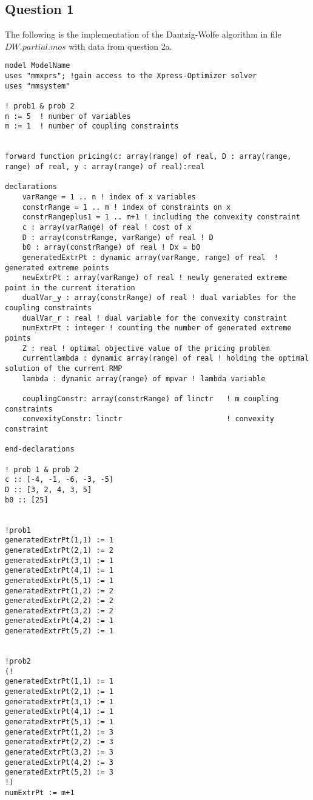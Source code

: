 \documentclass[twoside,12pt]{article}
\begin{document}
\subsection{Question 1}
\label{p3_q1}
The following is the implementation of the Dantzig-Wolfe algorithm in file $DW.partial.mos$ with data  from question 2a.
\\
\begin{verbatim}
model ModelName
uses "mmxprs"; !gain access to the Xpress-Optimizer solver
uses "mmsystem"

! prob1 & prob 2
n := 5  ! number of variables
m := 1  ! number of coupling constraints


forward function pricing(c: array(range) of real, D : array(range, range) of real, y : array(range) of real):real

declarations
	varRange = 1 .. n ! index of x variables
	constrRange = 1 .. m ! index of constraints on x
	constrRangeplus1 = 1 .. m+1 ! including the convexity constraint
	c : array(varRange) of real ! cost of x
	D : array(constrRange, varRange) of real ! D
	b0 : array(constrRange) of real ! Dx = b0
    generatedExtrPt : dynamic array(varRange, range) of real  ! generated extreme points
    newExtrPt : array(varRange) of real ! newly generated extreme point in the current iteration
    dualVar_y : array(constrRange) of real ! dual variables for the coupling constraints
    dualVar_r : real ! dual variable for the convexity constraint
    numExtrPt : integer ! counting the number of generated extreme points
    Z : real ! optimal objective value of the pricing problem
    currentlambda : dynamic array(range) of real ! holding the optimal solution of the current RMP
    lambda : dynamic array(range) of mpvar ! lambda variable
    
    couplingConstr: array(constrRange) of linctr   ! m coupling constraints
    convexityConstr: linctr                        ! convexity constraint
    
end-declarations

! prob 1 & prob 2
c :: [-4, -1, -6, -3, -5]
D :: [3, 2, 4, 3, 5]
b0 :: [25]


!prob1
generatedExtrPt(1,1) := 1
generatedExtrPt(2,1) := 2
generatedExtrPt(3,1) := 1
generatedExtrPt(4,1) := 1
generatedExtrPt(5,1) := 1
generatedExtrPt(1,2) := 2
generatedExtrPt(2,2) := 2
generatedExtrPt(3,2) := 2
generatedExtrPt(4,2) := 1
generatedExtrPt(5,2) := 1


!prob2
(!
generatedExtrPt(1,1) := 1
generatedExtrPt(2,1) := 1
generatedExtrPt(3,1) := 1
generatedExtrPt(4,1) := 1
generatedExtrPt(5,1) := 1
generatedExtrPt(1,2) := 3
generatedExtrPt(2,2) := 3
generatedExtrPt(3,2) := 3
generatedExtrPt(4,2) := 3
generatedExtrPt(5,2) := 3
!)
numExtrPt := m+1 


\end{verbatim}
\end{document}
